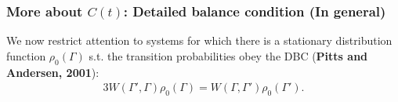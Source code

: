 \documentclass[8pt]{beamer}
\begin{document}
\begin{frame}
		\frametitle{More about  $C(t)$: Detailed balance condition (In general)}
We now restrict attention to systems for which there is a stationary distribution function
$\rho_0(\Gamma)$ s.t. the transition probabilities obey the DBC (\textbf{Pitts and Andersen, 2001}):
\begin{alignat}{3}
W(\Gamma',\Gamma) \rho_0(\Gamma) =W(\Gamma,\Gamma') \rho_0(\Gamma').
\end{alignat}

\end{frame}
\end{document}
